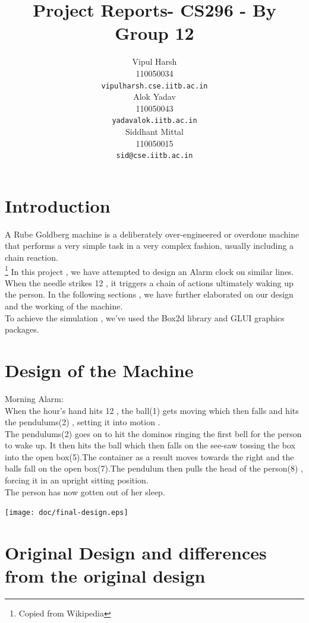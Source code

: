 \documentclass[a4paper,11pt]{report}
\title{Project Reports- CS296 - By Group 12}
\author{Vipul Harsh\\
        110050034\\
        \texttt{vipulharsh.cse.iitb.ac.in}\\[0.3 cm]
        Alok Yadav\\
        110050043\\
        \texttt{yadavalok.iitb.ac.in}\\[0.3 cm]
        Siddhant Mittal\\
        110050015\\
        \texttt{sid@cse.iitb.ac.in}
}
\begin{document}
\maketitle

\section{Introduction}

A Rube Goldberg machine is a deliberately over-engineered or overdone machine that performs a very simple task in a very complex fashion, usually including a chain reaction.\\
\footnote
  { 
 Copied from Wikipedia
 }
In this project , we have attempted to design an Alarm clock on similar lines. When the needle strikes 12 , it triggers a chain of actions ultimately waking up the person. In the following sections , we have further elaborated on our design and the working of the machine.
\\ To achieve the simulation , we've used the Box2d library and GLUI graphics packages.  




\section{Design of the Machine}

Morning Alarm: \\
When the hour's hand hits 12 , the ball(1) gets moving which then falls and hits the pendulums(2) , setting it into motion . \\
    The pendulums(2) goes on to hit the dominos ringing the first bell for the person to wake up. It then hits the ball which then falls on the see-saw tossing the box into the open box(5).The container as a result moves towards the right and the balls fall on the open box(7).The pendulum then pulls the head of the person(8) , forcing it in an upright sitting position.\\
    The person has now gotten out of her sleep.
	
\texttt{[image: doc/final-design.eps]}








\section{Original Design and differences from the original design}
\end{document}
